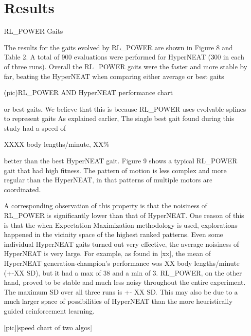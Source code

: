 \section{Results}

RL\_POWER Gaits

The results for the gaits evolved by RL\_POWER are shown in Figure 8
and Table 2. A total of 900 evaluations were performed for HyperNEAT
(300 in each of three runs). Overall the RL\_POWER gaits were the
faster and more stable by far, beating the HyperNEAT when comparing
either average or best gaits

(pic)RL\_POWER AND HyperNEAT performance chart


or best gaits. We believe that this is because RL\_POWER uses evolvable splines to represent gaits As explained earlier,  
The single best gait found during this study had a speed of

XXXX body lengths/minute, XX\%

better than the best HyperNEAT gait. Figure 9 shows a typical
RL\_POWER gait that had high fitness. The pattern of motion is less
complex and more regular than the HyperNEAT, in that patterns of
multiple motors are coordinated.

A corresponding observation of this property is that the noisiness of
RL\_POWER is significantly lower than that of HyperNEAT. One reason of
this is that the when Expectation Maximization methodology is used,
explorations happened in the vicinity space of the highest ranked
patterns. Even some individual HyperNEAT gaits turned out very
effective, the average noisiness of HyperNEAT is very large. For
example, as found in [xx], the mean of HyperNEAT generation-champion’s
performance was XX body lengths/minute (+-XX SD), but it had a max of
38 and a min of 3. RL\_POWER, on the other hand, proved to be stable
and much less noisy throughout the entire experiment. The maximum SD
over all three runs is +- XX SD. This may also be due to a much larger
space of possibilities of HyperNEAT than the more heuristically guided
reinforcement learning.

[pic][speed chart of two algos]


